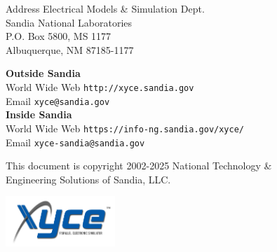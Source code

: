 \begin{flushright}
Address \hfill Electrical Models \& Simulation Dept.\\
     Sandia National Laboratories\\
     P.O. Box 5800, MS 1177\\
     Albuquerque, NM 87185-1177 \\
\end{flushright}

\noindent
\textbf{Outside Sandia}\\
World Wide Web \hfill 
  \texttt{\color{XyceDeepRed}http://xyce.sandia.gov}
\\
Email \hfill
  \texttt{\color{XyceDeepRed}xyce@sandia.gov}
\\

\noindent
\textbf{Inside Sandia}\\
World Wide Web \hfill 
  \texttt{\color{XyceDeepRed}https://info-ng.sandia.gov/xyce/}
\\
Email \hfill
  \texttt{\color{XyceDeepRed}xyce-sandia@sandia.gov}

\vfill
\noindent
\parbox{\textwidth}{
     \parbox{4.1in}{\small This document is copyright \textcopyright{}
     2002-2025 National Technology \&\\Engineering Solutions of Sandia, LLC.}
     \hfill
     \includegraphics[height=0.75in]{xyce_flat_white}
}

